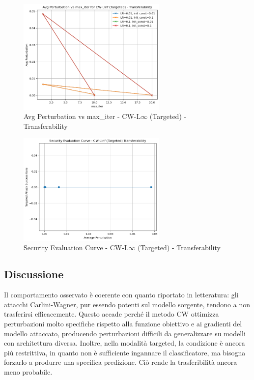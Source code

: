             \begin{figure}[H]
              \centering
              \includegraphics[width=0.65\textwidth]{images/cwlinf_transfer_perturb.png}
              \caption{Avg Perturbation vs max\_iter - CW-L$\infty$ (Targeted) - Transferability}
              \label{fig:cwlinf-transfer-perturb}
            \end{figure}
            
            \begin{figure}[H]
              \centering
              \includegraphics[width=0.65\textwidth]{images/cwlinf_transfer_sec_eval.png}
              \caption{Security Evaluation Curve - CW-L$\infty$ (Targeted) - Transferability}
              \label{fig:cwlinf-transfer-sec}
            \end{figure}

        \subsection{Discussione}
            Il comportamento osservato è coerente con quanto riportato in letteratura: gli attacchi Carlini-Wagner, pur essendo potenti sul modello sorgente, tendono a non trasferirsi efficacemente. Questo accade perché il metodo CW ottimizza perturbazioni molto specifiche rispetto alla funzione obiettivo e ai gradienti del modello attaccato, producendo perturbazioni difficili da generalizzare su modelli con architettura diversa.
            Inoltre, nella modalità targeted, la condizione è ancora più restrittiva, in quanto non è sufficiente ingannare il classificatore, ma bisogna forzarlo a produrre una specifica predizione. Ciò rende la trasferibilità ancora meno probabile.

